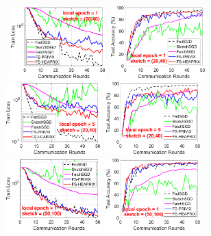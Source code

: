 \documentclass{article} %
\begin{document}
\begin{figure}[t]
	\begin{center}
		\mbox{\hspace{-0.15in}			   
		\includegraphics[width=1.45in]{MNIST_figures/local1_sketch20_iid0_train_loss.eps} \hspace{-0.12in}
		\includegraphics[width=1.45in]{MNIST_figures/local1_sketch20_iid0_test_acc.eps} 
		\includegraphics[width=1.45in]{MNIST_figures/local5_sketch20_iid0_train_loss.eps} \hspace{-0.12in}
		\includegraphics[width=1.45in]{MNIST_figures/local5_sketch20_iid0_test_acc.eps}
		}
		\mbox{\hspace{-0.15in}	
		 \includegraphics[width=1.45in]{MNIST_figures/local1_sketch50_iid0_train_loss.eps} \hspace{-0.12in}
		\includegraphics[width=1.45in]{MNIST_figures/local1_sketch50_iid0_test_acc.eps} 
}
\end{center}
\end{figure}
\end{document}
